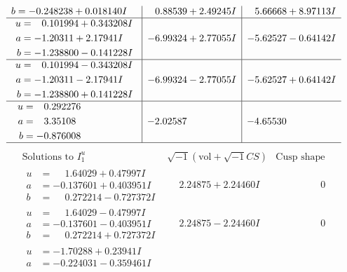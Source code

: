 \documentclass[1p]{elsarticle_modified}
\theoremstyle{definition}
\newcommand{\I}{\sqrt{-1}}
\begin{document}
$$\begin{array}{c|c|c}
\begin{aligned}
b &= -0.248238 + 0.018140 I\end{aligned}
 & \phantom{-}0.88539 + 2.49245 I & \phantom{-}5.66668 + 8.97113 I \\ \hline\begin{aligned}
u &= \phantom{-}0.101994 + 0.343208 I \\
a &= -1.20311 + 2.17941 I \\
b &= -1.238800 - 0.141228 I\end{aligned}
 & -6.99324 + 2.77055 I & -5.62527 - 0.64142 I \\ \hline\begin{aligned}
u &= \phantom{-}0.101994 - 0.343208 I \\
a &= -1.20311 - 2.17941 I \\
b &= -1.238800 + 0.141228 I\end{aligned}
 & -6.99324 - 2.77055 I & -5.62527 + 0.64142 I \\ \hline\begin{aligned}
u &= \phantom{-}0.292276\phantom{ +0.000000I} \\
a &= \phantom{-}3.35108\phantom{ +0.000000I} \\
b &= -0.876008\phantom{ +0.000000I}\end{aligned}
 & -2.02587\phantom{ +0.000000I} & -4.65530\phantom{ +0.000000I}\\
 \hline 
 \end{array}$$\newpage$$\begin{array}{c|c|c}  
\text{Solutions to }I^u_{1}& \I (\text{vol} + \sqrt{-1}CS) & \text{Cusp shape}\\
 \hline 
\begin{aligned}
u &= \phantom{-}1.64029 + 0.47997 I \\
a &= -0.137601 + 0.403951 I \\
b &= \phantom{-}0.272214 - 0.727372 I\end{aligned}
 & \phantom{-}2.24875 + 2.24460 I & \phantom{-0.000000 } 0 \\ \hline\begin{aligned}
u &= \phantom{-}1.64029 - 0.47997 I \\
a &= -0.137601 - 0.403951 I \\
b &= \phantom{-}0.272214 + 0.727372 I\end{aligned}
 & \phantom{-}2.24875 - 2.24460 I & \phantom{-0.000000 } 0 \\ \hline\begin{aligned}
u &= -1.70288 + 0.23941 I \\
a &= -0.224031 - 0.359461 I \\

\end{aligned}
\end{array}$$
\end{document}
